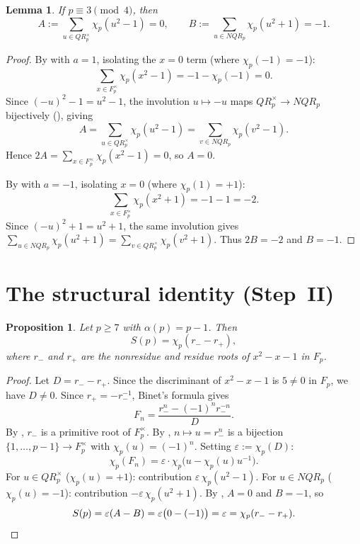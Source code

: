 \documentclass[preprint,5p,times,twocolumn]{elsarticle}
\def\F{F}\def\Z{Z}\def\Q{Q}\def\R{R}\def\N{N}%
\def\QR{QR}\def\NQR{NQR}}
\newtheorem{lemma}[theorem]{Lemma}
\newtheorem{proposition}[theorem]{Proposition}
\newcommand{\Z}{\mathbb{Z}}
\newcommand{\Q}{\mathbb{Q}}
\newcommand{\R}{\mathbb{R}}
\newcommand{\F}{\mathbb{F}}
\newcommand{\N}{\mathbb{N}}
\newcommand{\QR}{\mathrm{QR}}
\newcommand{\NQR}{\mathrm{NQR}}
\begin{document}
\begin{lemma}\label{lem:Q}
If $p\equiv 3\pmod 4$, then
\[
A:=\sum_{u\in\QR_p^\times}\chi_p(u^2-1)=0,\qquad
B:=\sum_{u\in\NQR_p}\chi_p(u^2+1)=-1.
\]
\end{lemma}

\begin{proof}
By  with $a=1$, isolating the $x=0$ term 
(where $\chi_p(-1)=-1$):
\[
\sum_{x\in\F_p^\times}\chi_p(x^2-1)
=-1-\chi_p(-1)=0.
\]
Since $(-u)^2-1=u^2-1$, the involution $u\mapsto-u$ maps 
$\QR_p^\times\to\NQR_p$ bijectively (), giving
\[
A=\sum_{u\in\QR_p^\times}\chi_p(u^2-1)
 =\sum_{v\in\NQR_p}\chi_p(v^2-1).
\]
Hence $2A=\sum_{x\in\F_p^\times}\chi_p(x^2-1)=0$, so $A=0$.

By  with $a=-1$, isolating $x=0$ 
(where $\chi_p(1)=+1$):
\[
\sum_{x\in\F_p^\times}\chi_p(x^2+1)=-1-1=-2.
\]
Since $(-u)^2+1=u^2+1$, the same involution gives 
$\sum_{u\in\NQR_p}\chi_p(u^2+1)=\sum_{v\in\QR_p^\times}\chi_p(v^2+1)$.
Thus $2B=-2$ and $B=-1$.
\end{proof}

\section{The structural identity (Step~II)}\label{sec:structural-identity}

\begin{proposition}\label{prop:structural}
Let $p\ge 7$ with $\alpha(p)=p-1$. Then
\[
S(p)=\chi_p(r_- - r_+),
\]
where $r_-$ and $r_+$ are the nonresidue and residue roots of 
$x^2-x-1$ in $\F_p$.
\end{proposition}

\begin{proof}
Let $D=r_- - r_+$. Since the discriminant of $x^2-x-1$ is 
$5\ne0$ in $\F_p$, we have $D\ne0$. Since $r_+=-r_-^{-1}$, 
Binet's formula gives
\[
F_n=\frac{r_-^n-(-1)^n r_-^{-n}}{D}.
\]
By , $r_-$ is a primitive root of $\F_p^\times$. 
By , $n\mapsto u=r_-^n$ is a 
bijection $\{1,\dots,p-1\}\to\F_p^\times$ with 
$\chi_p(u)=(-1)^n$. Setting $\varepsilon:=\chi_p(D)$:
\[
\chi_p(F_n)=\varepsilon\cdot\chi_p\!\bigl(u-\chi_p(u)u^{-1}\bigr).
\]
For $u\in\QR_p^\times$ ($\chi_p(u)=+1$): contribution 
$\varepsilon\,\chi_p(u^2-1)$.  
For $u\in\NQR_p$ ($\chi_p(u)=-1$): contribution 
$-\varepsilon\,\chi_p(u^2+1)$.
By , $A=0$ and $B=-1$, so
\[
S(p)=\varepsilon(A-B)=\varepsilon\bigl(0-(-1)\bigr)
=\varepsilon=\chi_p(r_- - r_+).\qedhere
\]
\end{proof}
\end{document}
